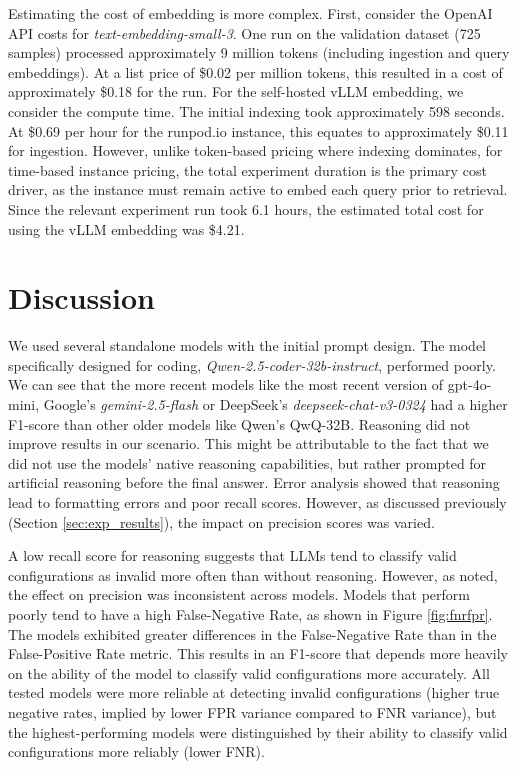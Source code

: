 Estimating the cost of embedding is more complex. First, consider the OpenAI API costs for \textit{text-embedding-small-3}. One run on the validation dataset (725 samples) processed approximately 9 million tokens (including ingestion and query embeddings). At a list price of \$0.02 per million tokens, this resulted in a cost of approximately \$0.18 for the run. For the self-hosted vLLM embedding, we consider the compute time. The initial indexing took approximately 598 seconds. At \$0.69 per hour for the runpod.io instance, this equates to approximately \$0.11 for ingestion. However, unlike token-based pricing where indexing dominates, for time-based instance pricing, the total experiment duration is the primary cost driver, as the instance must remain active to embed each query prior to retrieval. Since the relevant experiment run took 6.1 hours, the estimated total cost for using the vLLM embedding was \$4.21.




\section{Discussion} \label{sec:exp_discussion}

We used several standalone models with the initial prompt design. The model specifically designed for coding, \textit{Qwen-2.5-coder-32b-instruct}, performed poorly. We can see that the more recent models like the most recent version of gpt-4o-mini, Google's \textit{gemini-2.5-flash} or DeepSeek's \textit{deepseek-chat-v3-0324} had a higher F1-score than other older models like Qwen's QwQ-32B. Reasoning did not improve results in our scenario. This might be attributable to the fact that we did not use the models' native reasoning capabilities, but rather prompted for artificial reasoning before the final answer. Error analysis showed that reasoning lead to formatting errors and poor recall scores. However, as discussed previously (Section \ref{sec:exp_results}), the impact on precision scores was varied.

A low recall score for reasoning suggests that LLMs tend to classify valid configurations as invalid more often than without reasoning. However, as noted, the effect on precision was inconsistent across models. Models that perform poorly tend to have a high False-Negative Rate, as shown in Figure \ref{fig:fnrfpr}. The models exhibited greater differences in the False-Negative Rate than in the False-Positive Rate metric. This results in an F1-score that depends more heavily on the ability of the model to classify valid configurations more accurately. All tested models were more reliable at detecting invalid configurations (higher true negative rates, implied by lower FPR variance compared to FNR variance), but the highest-performing models were distinguished by their ability to classify valid configurations more reliably (lower FNR).


